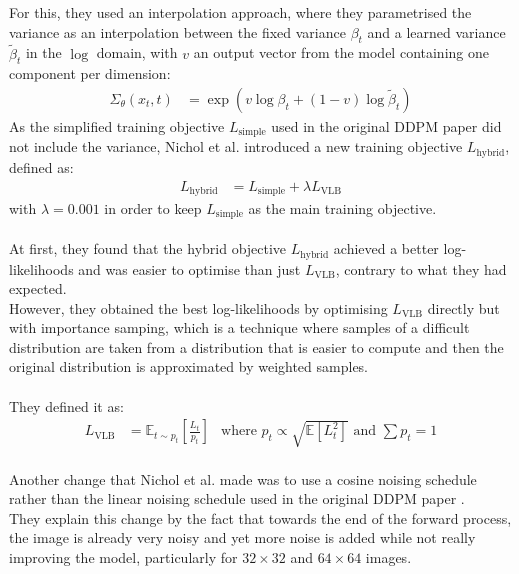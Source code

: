 \documentclass{article}
\begin{document}
For this, they used an interpolation approach, where they parametrised the variance as an interpolation between the fixed variance $\beta_t$ and a learned variance $\tilde{\beta}_t$ in the $\log$ domain, with $v$ an output vector from the model containing one component per dimension:
\begin{align}
  \Sigma_\theta (x_t, t) &= \exp \left( v \log \beta_t + (1 - v) \log \tilde{\beta}_t \right)
\end{align}
As the simplified training objective $L_{\text{simple}}$ used in the original DDPM paper \cite{ho2020denoising} did not include the variance, Nichol et al. \cite{nichol2021improved} introduced a new training objective $L_{\text{hybrid}}$, defined as:
\begin{align}
  L_{\text{hybrid}} &= L_{\text{simple}} + \lambda L_{\text{VLB}}
\end{align}
with $\lambda = 0.001$ in order to keep $L_{\text{simple}}$ as the main training objective. \cite{nichol2021improved}
\\\\
At first, they found that the hybrid objective $L_{\text{hybrid}}$ achieved a better log-likelihoods and was easier to optimise than just $L_{\text{VLB}}$, contrary to what they had expected. \cite{nichol2021improved} \\
However, they obtained the best log-likelihoods by optimising $L_{\text{VLB}}$ directly but with importance samping, which is a technique where samples of a difficult distribution are taken from a distribution that is easier to compute and then the original distribution is approximated by weighted samples. \cite{nichol2021improved}
\\\\
They defined it as:
\begin{align}
  L_{\text{VLB}} &= \mathbb{E}_{t \sim p_t} \left[ \frac{L_t}{p_t} \right]
  &\text{where } p_t \propto \sqrt{\mathbb{E}\left[ L_t^2 \right]} \text{ and } \sum p_t = 1
\end{align}
\\
Another change that Nichol et al. \cite{nichol2021improved} made was to use a cosine noising schedule rather than the linear noising schedule used in the original DDPM paper \cite{ho2020denoising}. \\
They explain this change by the fact that towards the end of the forward process, the image is already very noisy and yet more noise is added while not really improving the model, particularly for $32 \times 32$ and $64 \times 64$ images. \cite{nichol2021improved} \\
\end{document}
